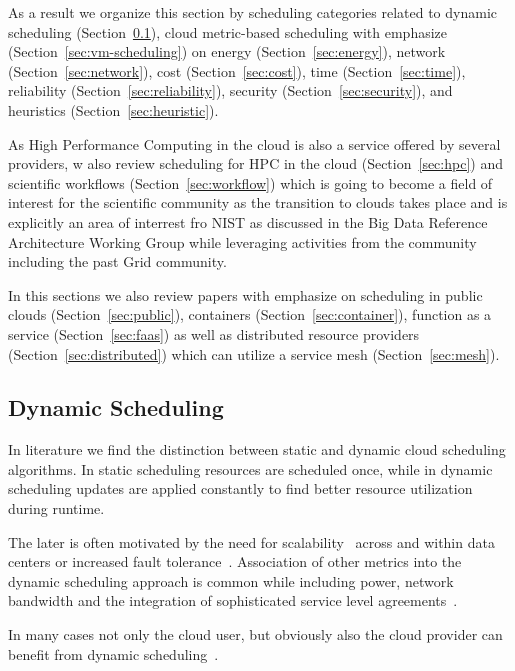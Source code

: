 \documentclass[final,5p,times,twocolumn]{elsarticle}
\begin{document}
As a result we organize this section by scheduling categories related to 
%
dynamic scheduling (Section~\ref{sec:dynamic}),
cloud metric-based scheduling with emphasize (Section~\ref{sec:vm-scheduling}) on 
energy (Section~\ref{sec:energy}),
network (Section~\ref{sec:network}),
cost (Section~\ref{sec:cost}),
time (Section~\ref{sec:time}),
reliability (Section~\ref{sec:reliability}),
security (Section~\ref{sec:security}), 
and heuristics (Section~\ref{sec:heuristic}).

As High Performance Computing in the cloud is also a service offered
by several providers, w also review scheduling for HPC in the cloud
(Section~\ref{sec:hpc}) and scientific workflows
(Section~\ref{sec:workflow}) which is going to become a field of
interest for the scientific community as the transition to clouds
takes place and is explicitly an area of interrest fro NIST as
discussed in the Big Data Reference Architecture Working Group while
leveraging activities from the community including the past Grid
community.

In this sections we also review papers with emphasize on scheduling in
public clouds (Section~\ref{sec:public}), 
containers (Section~\ref{sec:container}), function as a service
(Section~\ref{sec:faas}) as well as distributed resource providers
(Section~\ref{sec:distributed}) which can utilize a service mesh
(Section~\ref{sec:mesh}).





\subsection{Dynamic Scheduling}\label{sec:dynamic}

In literature we find the distinction between static and dynamic cloud
scheduling algorithms.  In static scheduling resources are scheduled
once, while in dynamic scheduling updates are applied constantly to
find better resource utilization during runtime.


The later is often motivated by the need for
scalability~\cite{keller2014hierarchical} across and within data
centers or increased fault
tolerance~\cite{tighe2013distributed}. Association of other metrics
into the dynamic scheduling approach is common while including power,
network bandwidth and the integration of sophisticated service level
agreements~\cite{tighe2013distributed}.

In many cases not only the cloud user, but obviously also the cloud
provider can benefit from dynamic
scheduling~\cite{tighe2014integrating}.
\end{document}
